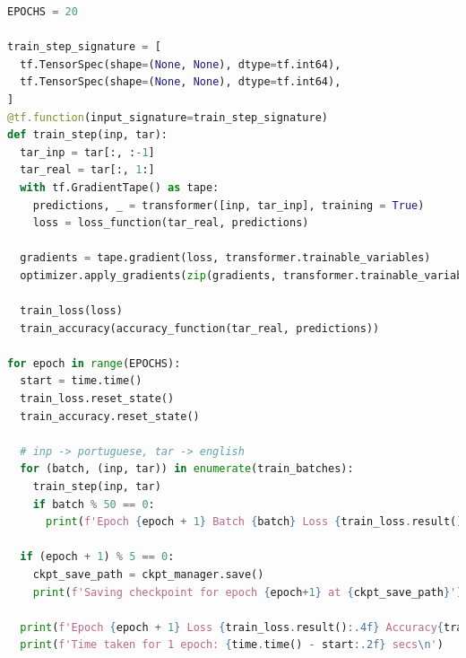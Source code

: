 \begin{lstlisting}[language=Python, style=input]
EPOCHS = 20

train_step_signature = [
  tf.TensorSpec(shape=(None, None), dtype=tf.int64),
  tf.TensorSpec(shape=(None, None), dtype=tf.int64),
]
@tf.function(input_signature=train_step_signature)
def train_step(inp, tar):
  tar_inp = tar[:, :-1]
  tar_real = tar[:, 1:]
  with tf.GradientTape() as tape:
    predictions, _ = transformer([inp, tar_inp], training = True)
    loss = loss_function(tar_real, predictions)

  gradients = tape.gradient(loss, transformer.trainable_variables)
  optimizer.apply_gradients(zip(gradients, transformer.trainable_variables))

  train_loss(loss)
  train_accuracy(accuracy_function(tar_real, predictions))

for epoch in range(EPOCHS):
  start = time.time()
  train_loss.reset_state()
  train_accuracy.reset_state()

  # inp -> portuguese, tar -> english
  for (batch, (inp, tar)) in enumerate(train_batches):
    train_step(inp, tar)
    if batch % 50 == 0:
      print(f'Epoch {epoch + 1} Batch {batch} Loss {train_loss.result():.4f} Accuracy{train_accuracy.result():.4f}')

  if (epoch + 1) % 5 == 0:
    ckpt_save_path = ckpt_manager.save()
    print(f'Saving checkpoint for epoch {epoch+1} at {ckpt_save_path}')

  print(f'Epoch {epoch + 1} Loss {train_loss.result():.4f} Accuracy{train_accuracy.result():.4f}')
  print(f'Time taken for 1 epoch: {time.time() - start:.2f} secs\n')
\end{lstlisting}

